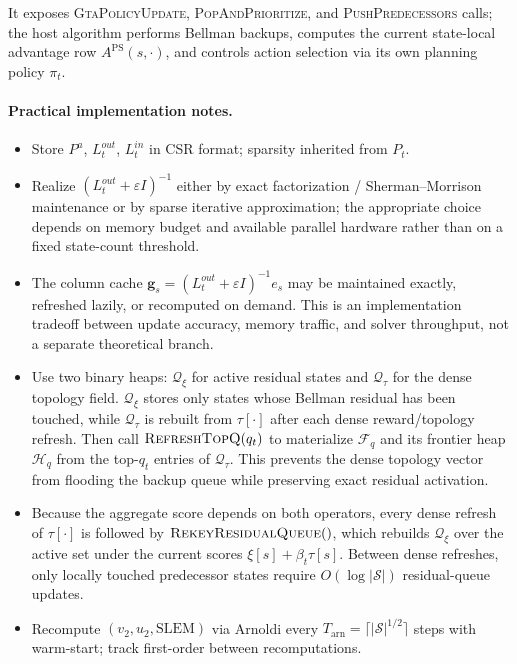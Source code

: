 \documentclass[10pt,a4paper]{article}
\begin{document}
It exposes \textsc{GtaPolicyUpdate}, \textsc{PopAndPrioritize}, and
\textsc{PushPredecessors} calls; the host algorithm performs Bellman backups,
computes the current state-local advantage row $A^{\mathrm{PS}}(s,\cdot)$, and
controls action selection via its own planning policy $\pi_t$.

\paragraph{Practical implementation notes.}
\begin{itemize}\setlength\itemsep{1pt}
  \item Store $P^a$, $L^{out}_t$, $L^{in}_t$ in CSR format; sparsity inherited from $P_t$.
  \item Realize $(L^{out}_t+\varepsilon I)^{-1}$ either by exact factorization / Sherman--Morrison maintenance or by sparse iterative approximation; the appropriate choice depends on memory budget and available parallel hardware rather than on a fixed state-count threshold.
  \item The column cache $\mathbf{g}_s=(L^{out}_t+\varepsilon I)^{-1}e_s$ may be maintained exactly, refreshed lazily, or recomputed on demand.  This is an implementation tradeoff between update accuracy, memory traffic, and solver throughput, not a separate theoretical branch.
  \item Use two binary heaps: $\mathcal{Q}_{\xi}$ for active residual states and $\mathcal{Q}_{\tau}$ for the dense topology field. $\mathcal{Q}_{\xi}$ stores only states whose Bellman residual has been touched, while $\mathcal{Q}_{\tau}$ is rebuilt from $\tau[\cdot]$ after each dense reward/topology refresh. Then call $\textsc{RefreshTopQ}(q_t)$ to materialize $\mathcal{F}_q$ and its frontier heap $\mathcal{H}_q$ from the top-$q_t$ entries of $\mathcal{Q}_{\tau}$. This prevents the dense topology vector from flooding the backup queue while preserving exact residual activation.
  \item Because the aggregate score depends on both operators, every dense refresh of $\tau[\cdot]$ is followed by $\textsc{RekeyResidualQueue}()$, which rebuilds $\mathcal{Q}_{\xi}$ over the active set under the current scores $\xi[s]+\beta_t\tau[s]$. Between dense refreshes, only locally touched predecessor states require $O(\log|\mathcal{S}|)$ residual-queue updates.
  \item Recompute $(v_2, u_2, \mathrm{SLEM})$ via Arnoldi every $T_{\mathrm{arn}} = \lceil|\mathcal{S}|^{1/2}\rceil$ steps with warm-start; track first-order between recomputations.
\end{itemize}
\end{document}
